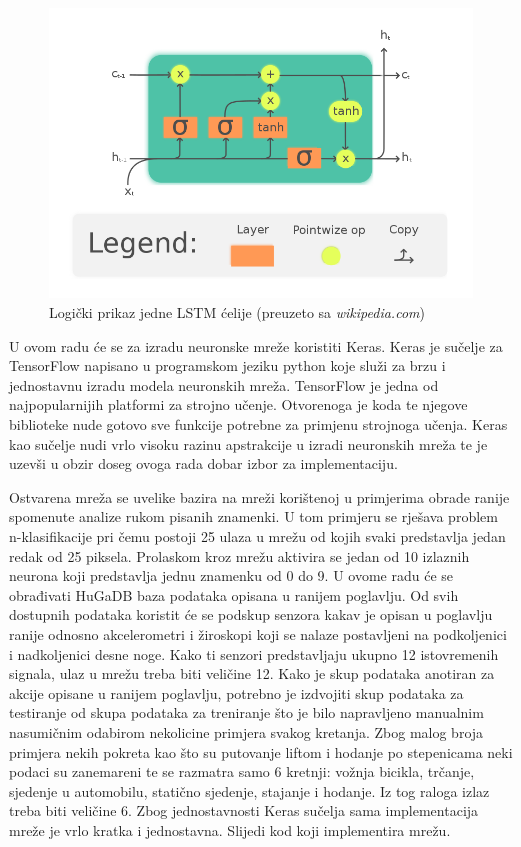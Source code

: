 \documentclass[times, utf8, diplomski]{fer}
\begin{document}
\begin{figure}[h!]
    \includegraphics[width=\textwidth]{The_LSTM_Cell.svg.png}
    \caption{Logički prikaz jedne LSTM ćelije (preuzeto sa \textit{wikipedia.com})}
    \label{lstm}
\end{figure}

U ovom radu će se za izradu neuronske mreže koristiti Keras. Keras je sučelje za TensorFlow napisano u programskom jeziku
python koje služi za brzu i jednostavnu izradu modela neuronskih mreža.
TensorFlow je jedna od najpopularnijih platformi za strojno učenje. Otvorenoga je koda te njegove biblioteke
nude gotovo sve funkcije potrebne za primjenu strojnoga učenja. Keras kao sučelje nudi vrlo visoku razinu
apstrakcije u izradi neuronskih mreža te je uzevši u obzir doseg ovoga rada dobar izbor za implementaciju.

Ostvarena mreža se uvelike bazira na mreži korištenoj u primjerima obrade ranije spomenute analize rukom
pisanih znamenki. U tom primjeru se rješava problem n-klasifikacije pri čemu postoji 25 ulaza u mrežu od kojih
svaki predstavlja jedan redak od 25 piksela. Prolaskom kroz mrežu aktivira se jedan od 10 izlaznih neurona
koji predstavlja jednu znamenku od 0 do 9. U ovome radu će se obrađivati HuGaDB baza podataka opisana u ranijem
poglavlju. Od svih dostupnih podataka koristit će se podskup senzora kakav je opisan u poglavlju ranije odnosno
akcelerometri i žiroskopi koji se nalaze postavljeni na podkoljenici i nadkoljenici desne noge. Kako ti senzori
predstavljaju ukupno 12 istovremenih signala, ulaz u mrežu treba biti veličine 12. Kako je skup podataka anotiran
za akcije opisane u ranijem poglavlju, potrebno je izdvojiti skup podataka za testiranje od skupa podataka za 
treniranje što je bilo napravljeno manualnim nasumičnim odabirom nekolicine primjera svakog kretanja. Zbog malog broja
primjera nekih pokreta kao što su putovanje liftom i hodanje po stepenicama neki podaci su zanemareni te se 
razmatra samo 6 kretnji: vožnja bicikla, trčanje, sjedenje u automobilu, statično sjedenje, stajanje i hodanje.
Iz tog raloga izlaz treba biti veličine 6. Zbog jednostavnosti Keras sučelja sama implementacija mreže je
vrlo kratka i jednostavna. Slijedi kod koji implementira mrežu.
\end{document}
